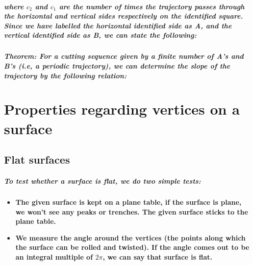 \documentclass{report}
\begin{document}


\paragraph{where $c_{2}$ and $c_{1}$ are the number of times the trajectory passes through the horizontal and vertical sides respectively on the identified square.\\ Since we have labelled the horizontal identified side as A, and the vertical identified side as B, we can state the following:}

\paragraph{\textit{Theorem}: For a cutting sequence given by a finite number of A’s and B’s (i.e, a periodic trajectory), we can determine the slope of the trajectory by the following relation:}







\appendix

\chapter{Properties regarding vertices on a surface}

\section{Flat surfaces}

\paragraph{To test whether a surface is flat, we do two simple tests:}

\begin{itemize}
\item \textbf{The given surface is kept on a plane table, if the surface is plane, we won’t see any peaks or trenches. The given surface sticks to the plane table.}

\item \textbf{ We measure the angle around the vertices (the points along which the surface can be rolled and twisted). If the angle comes out to be an integral multiple of $2\pi$, we can say that surface is flat.}
\end{itemize}
\end{document}

